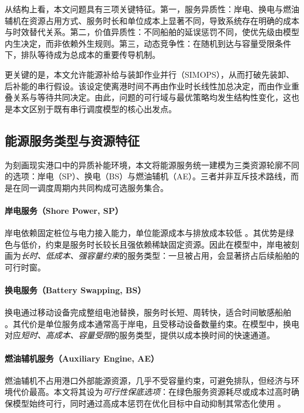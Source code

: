 \documentclass[UTF8, a4paper, 12pt]{ctexart}
\theoremstyle{plain}
\theoremstyle{definition}
\theoremstyle{remark}
\begin{document}
从结构上看，本文问题具有三项关键特征。第一，服务异质性：岸电、换电与燃油辅机在资源占用方式、服务时长和单位成本上显著不同，导致系统存在明确的成本与时效替代关系。第二，价值异质性：不同船舶的延误惩罚不同，使优先级由模型内生决定，而非依赖外生规则。第三，动态竞争性：在随机到达与容量受限条件下，排队等待成为总成本的重要传导机制。

更关键的是，本文允许能源补给与装卸作业并行（SIMOPS），从而打破先装卸、后补能的串行假设。该设定使离港时间不再由作业时长线性加总决定，而由作业重叠关系与等待共同决定。由此，问题的可行域与最优策略均发生结构性变化，这也是本文区别于既有串行调度模型的核心出发点。

\subsection{能源服务类型与资源特征}
\label{sec:energy_service_types}

为刻画现实港口中的异质补能环境，本文将能源服务统一建模为三类资源轮廓不同的选项：岸电（SP）、换电（BS）与燃油辅机（AE）。三者并非互斥技术路线，而是在同一调度周期内共同构成可选服务集合。

\paragraph{岸电服务（Shore Power, SP）}
岸电依赖固定桩位与电力接入能力，单位能源成本与排放成本较低 \cite{andersson2017shipping,bergqvist2019ports}。其优势是绿色与低价，约束是服务时长较长且强依赖稀缺固定资源。因此在模型中，岸电被刻画为\emph{长时、低成本、强容量约束}的服务类型：一旦被占用，会显著挤占后续船舶的可行时窗。

\paragraph{换电服务（Battery Swapping, BS）}
换电通过移动设备完成整组电池替换，服务时长短、周转快，适合时间敏感船舶 \cite{Zhang2022_EShip,Bei2024}。其代价是单位服务成本通常高于岸电，且受移动设备数量约束。在模型中，换电对应\emph{短时、高成本、容量受限}的服务类型，提供以成本换时间的快速通道。

\paragraph{燃油辅机服务（Auxiliary Engine, AE）}
燃油辅机不占用港口外部能源资源，几乎不受容量约束，可避免排队，但经济与环境代价最高。本文将其设为\emph{可行性保底选项}：在绿色服务资源耗尽或成本过高时确保模型始终可行，同时通过高成本惩罚在优化目标中自动抑制其常态化使用 \cite{Cordeau2015,pinedo2016scheduling}。
\end{document}
